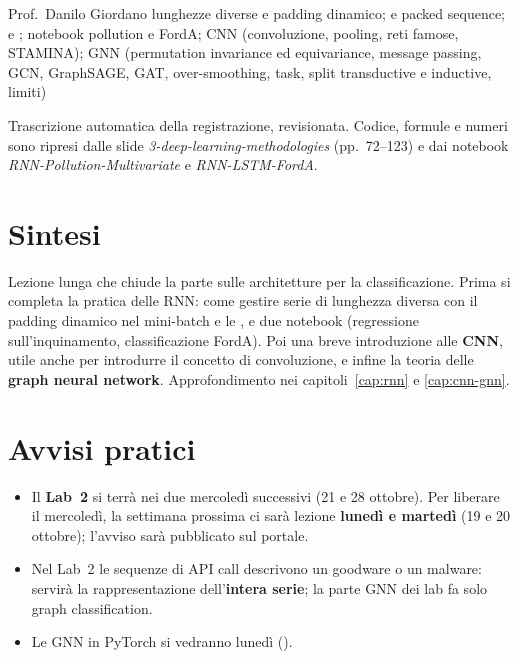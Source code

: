   {Prof.~Danilo Giordano}
  {lunghezze diverse e padding dinamico;  e packed sequence;  e
   ; notebook pollution e FordA; CNN (convoluzione, pooling, reti famose, STAMINA); GNN
   (permutation invariance ed equivariance, message passing, GCN, GraphSAGE, GAT, over-smoothing,
   task, split transductive e inductive, limiti)}
\label{lez:2026-10-14}

\begin{nota}[Fonte]
Trascrizione automatica della registrazione, revisionata. Codice, formule e numeri sono ripresi dalle
slide \emph{3-deep-learning-methodologies} (pp.~72--123) e dai notebook
\emph{RNN-Pollution-Multivariate} e \emph{RNN-LSTM-FordA}.
\end{nota}

\section{Sintesi}
Lezione lunga che chiude la parte sulle architetture per la classificazione. Prima si completa la
pratica delle RNN: come gestire serie di lunghezza diversa con il padding dinamico nel mini-batch e le
, e due notebook (regressione sull'inquinamento, classificazione FordA). Poi una
breve introduzione alle \textbf{CNN}, utile anche per introdurre il concetto di convoluzione, e infine
la teoria delle \textbf{graph neural network}. Approfondimento nei capitoli~\ref{cap:rnn} e
\ref{cap:cnn-gnn}.

\section{Avvisi pratici}
\begin{itemize}
  \item Il \textbf{Lab~2} si terrà nei due mercoledì successivi (21 e 28 ottobre). Per liberare il
    mercoledì, la settimana prossima ci sarà lezione \textbf{lunedì e martedì} (19 e 20 ottobre);
    l'avviso sarà pubblicato sul portale.
  \item Nel Lab~2 le sequenze di API call descrivono un goodware o un malware: servirà la
    rappresentazione dell'\textbf{intera serie}; la parte GNN dei lab fa solo graph classification.
  \item Le GNN in PyTorch si vedranno lunedì ().
\end{itemize}

